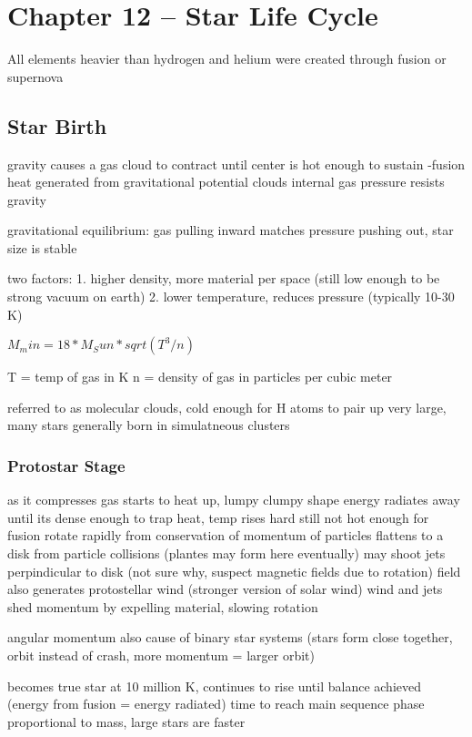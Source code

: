 \section{Chapter 12 -- Star Life Cycle}
All elements heavier than hydrogen and helium were created through fusion or supernova

\subsection{Star Birth}
gravity causes a gas cloud to contract until center is hot enough to sustain -fusion
heat generated from gravitational potential
clouds internal gas pressure resists gravity

gravitational equilibrium: gas pulling inward matches pressure pushing out, star size is stable

two factors:
    1. higher density, more material per space (still low enough to be strong vacuum on earth)
    2. lower temperature, reduces pressure (typically 10-30 K)

$M_min = 18 * M_Sun * sqrt(T^3 / n)$

T = temp of gas in K
n = density of gas in particles per cubic meter

referred to as molecular clouds, cold enough for H atoms to pair up
very large, many stars generally born in simulatneous clusters


\subsubsection{Protostar Stage}
    as it compresses gas starts to heat up, lumpy clumpy shape
    energy radiates away until its dense enough to trap heat, temp rises hard
    still not hot enough for fusion
    rotate rapidly from conservation of momentum of particles
    flattens to a disk from particle collisions (plantes may form here eventually)
    may shoot jets perpindicular to disk (not sure why, suspect magnetic fields due to rotation)
    field also generates protostellar wind (stronger version of solar wind)
    wind and jets shed momentum by expelling material, slowing rotation

    angular momentum also cause of binary star systems (stars form close together, orbit instead of crash, more momentum = larger orbit)

    becomes true star at 10 million K, continues to rise until balance achieved (energy from fusion = energy radiated)
    time to reach main sequence phase proportional to mass, large stars are faster

